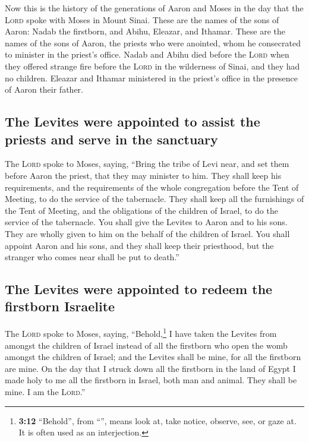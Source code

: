  Now this is the history of the generations of Aaron and
Moses in the day that the \textsc{Lord} spoke with Moses in Mount Sinai.
 These are the names of the sons of Aaron: Nadab the
firstborn, and Abihu, Eleazar, and Ithamar.  These are the
names of the sons of Aaron, the priests who were anointed, whom he
consecrated to minister in the priest's office.  Nadab and
Abihu died before the \textsc{Lord} when they offered strange fire
before the \textsc{Lord} in the wilderness of Sinai, and they had no
children. Eleazar and Ithamar ministered in the priest's office in the
presence of Aaron their father.

\hypertarget{the-levites-were-appointed-to-assist-the-priests-and-serve-in-the-sanctuary}{%
\subsection{The Levites were appointed to assist the priests and serve
in the
sanctuary}\label{the-levites-were-appointed-to-assist-the-priests-and-serve-in-the-sanctuary}}

 The \textsc{Lord} spoke to Moses, saying, 
``Bring the tribe of Levi near, and set them before Aaron the priest,
that they may minister to him.  They shall keep his
requirements, and the requirements of the whole congregation before the
Tent of Meeting, to do the service of the tabernacle. 
They shall keep all the furnishings of the Tent of Meeting, and the
obligations of the children of Israel, to do the service of the
tabernacle.  You shall give the Levites to Aaron and to
his sons. They are wholly given to him on the behalf of the children of
Israel.  You shall appoint Aaron and his sons, and they
shall keep their priesthood, but the stranger who comes near shall be
put to death.''

\hypertarget{the-levites-were-appointed-to-redeem-the-firstborn-israelite}{%
\subsection{The Levites were appointed to redeem the firstborn
Israelite}\label{the-levites-were-appointed-to-redeem-the-firstborn-israelite}}

 The \textsc{Lord} spoke to Moses, saying,
 ``Behold,\footnote{\textbf{3:12} ``Behold'', from
  ``'', means look at, take notice, observe, see, or gaze
  at. It is often used as an interjection.} I have taken the Levites
from amongst the children of Israel instead of all the firstborn who
open the womb amongst the children of Israel; and the Levites shall be
mine,  for all the firstborn are mine. On the day that I
struck down all the firstborn in the land of Egypt I made holy to me all
the firstborn in Israel, both man and animal. They shall be mine. I am
the \textsc{Lord}.''

